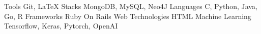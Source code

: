 



  \begin{cvskills}
  \cvskill
    {Tools}
    {Git, LaTeX}
  \cvskill
    {Stacks}
    {MongoDB, MySQL, Neo4J}
  \cvskill
    {Languages}
    {C, Python, Java, Go, R}
  \cvskill
    {Frameworks}
    {Ruby On Rails}
  \cvskill
    {Web Technologies}
    {HTML}
  \cvskill
    {Machine Learning}
    {Tensorflow, Keras, Pytorch, OpenAI}


  \end{cvskills}


